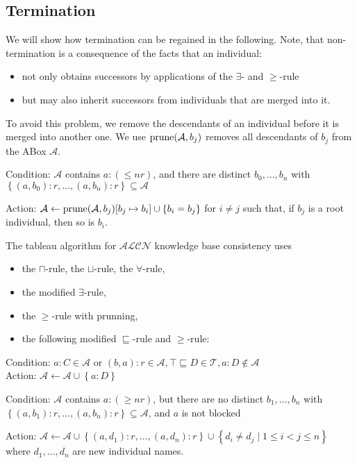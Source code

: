 \subsection{Termination}
We will show how termination can be regained in the following.
Note, that non-termination is a consequence of the facts that an individual:
\begin{itemize}
	\item not only obtains successors by applications of the $\exists$- and $ \geq$-rule
	\item but may also inherit successors from individuals that are merged into it.
\end{itemize}

To avoid this problem, we remove the descendants of an individual before it is merged into another one.
We use $\operatorname{\text{prune}}(\mathcal{A},b_j)$ removes all descendants of $b_j$ from the ABox $\mathcal{A}$.
\begin{mdframed}[frametitle= The $ \leq$-rule with prunning]
	Condition: $\mathcal{A}$ contains $a:( \leq nr)$, and there are distinct
	$b_0, \ldots, b_n$ with $\left\{ (a,b_0):r, \ldots, (a,b_n):r \right\} \subseteq \mathcal{A}$

	Action: $\mathcal{A} \leftarrow \operatorname{\text{prune}}(\mathcal{A}, b_j)[b_j \mapsto b_i] \cup \left\{ b_i = b_j \right\}$
	for $i \neq j$ such that, if $b_j$ is a root individual, then so is $b_i$.
\end{mdframed}

The tableau algorithm for $\mathcal{ALCN}$ knowledge base consistency uses
\begin{itemize}
	\item the $\sqcap$-rule, the $\sqcup$-rule, the $\forall$-rule,
	\item the modified $\exists$-rule,
	\item the $ \geq$-rule with prunning,
	\item the following modified $\sqsubseteq$-rule and $ \geq$-rule:
\end{itemize}
\begin{mdframed}[frametitle= The modified $\sqsubseteq$-rule, nobreak = true]
	Condition: $a : C \in \mathcal{A}$ or $ (b,a):r \in \mathcal{A}, \top \sqsubseteq D \in \mathcal{T}, a : D \notin \mathcal{A}$\\
	Action: $\mathcal{A} \leftarrow \mathcal{A} \cup \left\{ a: D \right\}$
\end{mdframed}
\begin{mdframed}[frametitle= The modified $ \geq$-rule, nobreak = true]
	Condition: $\mathcal{A}$ contains $a:( \geq nr)$, but there are no distinct
	$b_1, \ldots, b_n$ with $\left\{ (a,b_1):r, \ldots, (a,b_n):r \right\} \subseteq \mathcal{A}$,
	and $a$ is not blocked

	Action: $\mathcal{A} \leftarrow \mathcal{A} \cup \left\{ (a,d_1):r, \ldots, (a,d_n):r \right\} \cup \left\{ d_i \neq d_j \mid 1 \leq i < j \leq n \right\}$
	where $d_1, \ldots, d_n$ are new individual names.
\end{mdframed}

